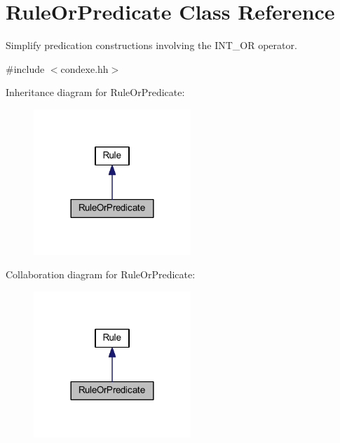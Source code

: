 \hypertarget{class_rule_or_predicate}{}\section{Rule\+Or\+Predicate Class Reference}
\label{class_rule_or_predicate}


Simplify predication constructions involving the I\+N\+T\+\_\+\+OR operator.  




{\ttfamily \#include $<$condexe.\+hh$>$}



Inheritance diagram for Rule\+Or\+Predicate\+:
\nopagebreak
\begin{figure}[H]
\begin{center}
\leavevmode
\includegraphics[width=168pt]{class_rule_or_predicate__inherit__graph}
\end{center}
\end{figure}


Collaboration diagram for Rule\+Or\+Predicate\+:
\nopagebreak
\begin{figure}[H]
\begin{center}
\leavevmode
\includegraphics[width=168pt]{class_rule_or_predicate__coll__graph}
\end{center}
\end{figure}
